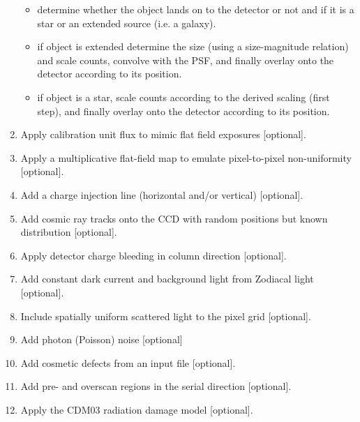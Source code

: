 \documentclass[a4paper,12pt,english]{sphinxmanual}
\begin{document}
\begin{enumerate}
\begin{itemize}
\item {} 
determine whether the object lands on to the detector or not and if it is
a star or an extended source (i.e. a galaxy).

\item {} 
if object is extended determine the size (using a size-magnitude relation) and scale counts,
convolve with the PSF, and finally overlay onto the detector according to its position.

\item {} 
if object is a star, scale counts according to the derived
scaling (first step), and finally overlay onto the detector according to its position.

\end{itemize}

\item {} 
Apply calibration unit flux to mimic flat field exposures {[}optional{]}.

\item {} 
Apply a multiplicative flat-field map to emulate pixel-to-pixel non-uniformity {[}optional{]}.

\item {} 
Add a charge injection line (horizontal and/or vertical) {[}optional{]}.

\item {} 
Add cosmic ray tracks onto the CCD with random positions but known distribution {[}optional{]}.

\item {} 
Apply detector charge bleeding in column direction {[}optional{]}.

\item {} 
Add constant dark current and background light from Zodiacal light {[}optional{]}.

\item {} 
Include spatially uniform scattered light to the pixel grid {[}optional{]}.

\item {} 
Add photon (Poisson) noise {[}optional{]}

\item {} 
Add cosmetic defects from an input file {[}optional{]}.

\item {} 
Add pre- and overscan regions in the serial direction {[}optional{]}.

\item {} 
Apply the CDM03 radiation damage model {[}optional{]}.


\end{enumerate}
\end{document}
